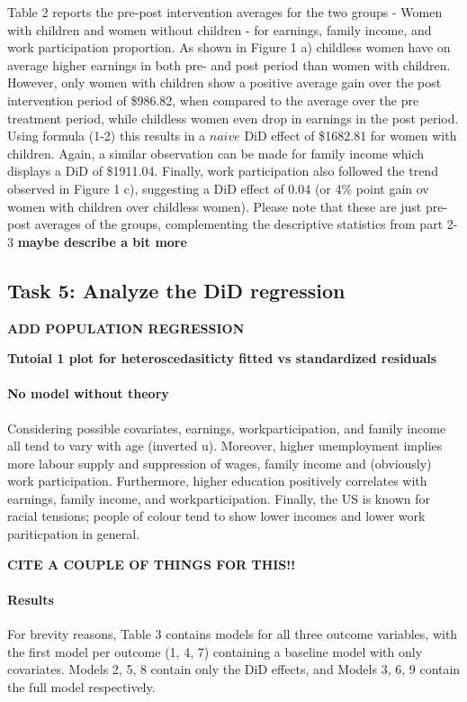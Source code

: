 \documentclass[a4paper]{article}
\begin{document}
Table 2 reports the pre-post intervention averages for the two groups - Women with children and women without children - for earnings, family income, and work participation proportion. As shown in Figure 1 a) childless women have on average higher earnings in both pre- and post period than women with children. However, only women with children show a positive average gain over the post intervention period of \$986.82, when compared to the average over the pre treatment period, while childless women even drop in earnings in the post period. Using formula (1-2) this results in a $naive$ DiD effect of \$1682.81 for women with children. Again, a similar observation can be made for family income which displays a DiD of \$1911.04. Finally, work participation also followed the trend observed in Figure 1 c), suggesting a DiD effect of 0.04 (or 4\% point gain ov women with children over childless women). Please note that these are just pre-post averages of the groups, complementing the descriptive statistics from part 2-3
\textbf{maybe describe a bit more}

\subsection{Task 5: Analyze the DiD regression}
\textbf{ADD POPULATION REGRESSION}

\textbf{Tutoial 1 plot for heteroscedasiticty fitted vs standardized residuals}

\paragraph{No model without theory} Considering possible covariates, earnings, workparticipation, and family income all tend to vary with age (inverted u). Moreover, higher unemployment implies more labour supply and suppression of wages, family income and (obviously) work participation. Furthermore, higher education positively correlates with earnings, family income, and workparticipation. Finally, the US is known for racial tensions; people of colour tend to show lower incomes and lower work pariticpation in general. 

\textbf{CITE A COUPLE OF THINGS FOR THIS!!}

\paragraph{Results} For brevity reasons, Table 3 contains models for all three outcome variables, with the first model per outcome (1, 4, 7) containing a baseline model with only covariates. Models 2, 5, 8 contain only the DiD effects, and Models 3, 6, 9 contain the full model respectively. 
\end{document}
